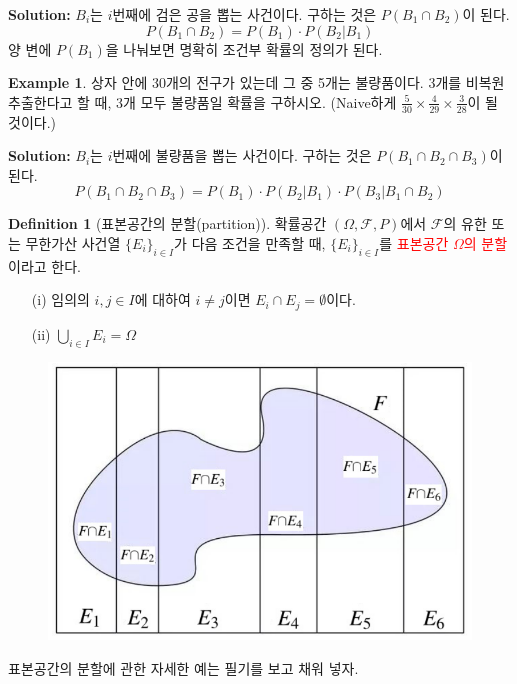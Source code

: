 \documentclass{article}
\theoremstyle{definition}
\newtheorem{definition}[theorem]{Definition}
\newtheorem{example}[theorem]{Example}
\begin{document}
\noindent
\textbf{Solution:} $B_i$는 $i$번째에 검은 공을 뽑는 사건이다. 구하는 것은 $P(B_1 \cap B_2)$이 된다.
\begin{equation*}
    P(B_1 \cap B_2) = P(B_1) \cdot P(B_2 | B_1)
\end{equation*}
양 변에 $P(B_1)$을 나눠보면 명확히 조건부 확률의 정의가 된다.


\begin{example}
    상자 안에 30개의 전구가 있는데 그 중 5개는 불량품이다. 3개를 비복원추출한다고 할 때, 3개 모두 불량품일 확률을 구하시오. (Naive하게 $\frac{5}{30} \times \frac{4}{29} \times \frac{3}{28}$이 될 것이다.)
\end{example}

\noindent
\textbf{Solution:} $B_i$는 $i$번째에 불량품을 뽑는 사건이다. 구하는 것은 $P(B_1 \cap B_2 \cap B_3)$이 된다.
\begin{equation*}
    P(B_1 \cap B_2 \cap B_3) = P(B_1) \cdot P(B_2 | B_1) \cdot P(B_3 | B_1 \cap B_2)
\end{equation*}

\newpage

\begin{definition}[표본공간의 분할(partition)]
    확률공간 $(\Omega, \mathcal{F}, P)$에서 $\mathcal{F}$의 유한 또는 무한가산 사건열 $\{E_i\}_{i \in I}$가 다음 조건을 만족할 때, $\{E_i\}_{i \in I}$를 \textcolor{red}{표본공간 $\Omega$의 분할}이라고 한다.
    \begin{enumerate}
        \item[(i)] 임의의 $i, j \in I$에 대하여 $i \ne j$이면 $E_i \cap E_j = \emptyset$이다.
        \item[(ii)] \(\displaystyle \bigcup_{i \in I} E_i = \Omega\)
    \end{enumerate}
\end{definition}

\begin{figure}[h]
    \centering
    \includegraphics[width = 0.4\linewidth]{image/fig1_2.png}
\end{figure}

\noindent
표본공간의 분할에 관한 자세한 예는 필기를 보고 채워 넣자.
\end{document}
